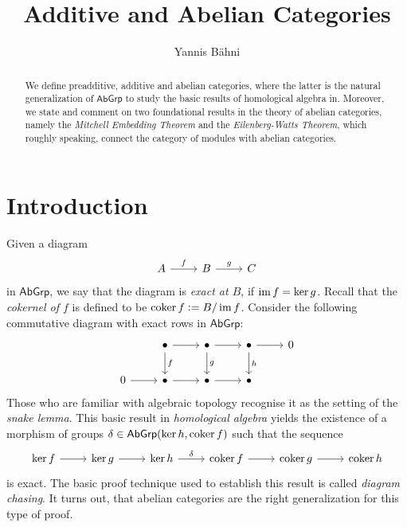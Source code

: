

\title{Additive and Abelian Categories}
\author{Yannis B\"{a}hni}
\address[Yannis B\"{a}hni]{University of Zurich, R\"{a}mistrasse 71, 8006 Zurich}



\begin{abstract}
	We define preadditive, additive and abelian categories, where the latter is the natural generalization of $\mathsf{AbGrp}$ to study the basic results of homological algebra in. Moreover, we state and comment on two foundational results in the theory of abelian categories, namely the \emph{Mitchell Embedding Theorem} and the \emph{Eilenberg-Watts Theorem}, which roughly speaking, connect the category of modules with abelian categories.
\end{abstract}

\maketitle

\tableofcontents

\section{Introduction}
Given a diagram
\begin{equation*}
	\begin{tikzcd}
		A \arrow[r,"f"] & B \arrow[r,"g"] & C
	\end{tikzcd}
\end{equation*}
\noindent in $\mathsf{AbGrp}$, we say that the diagram is \emph{exact at $B$}, if $\operatorname{im} f = \ker g$. Recall that the \emph{cokernel of $f$} is defined to be $\operatorname{coker} f := B/\operatorname{im} f$. Consider the following commutative diagram with exact rows in $\mathsf{AbGrp}$:
\begin{equation*}
	\begin{tikzcd}
		& \bullet \arrow[r]\arrow[d,"f"] & \bullet \arrow[r]\arrow[d,"g"] & \bullet \arrow[r]\arrow[d,"h"] & 0\\
		0 \arrow[r] & \bullet \arrow[r] & \bullet \arrow[r] & \bullet
	\end{tikzcd}
\end{equation*}
Those who are familiar with algebraic topology recognise it as the setting of the \emph{snake lemma}. This basic result in \emph{homological algebra} yields the existence of a morphism of groups $\delta \in \mathsf{AbGrp}(\ker h,\operatorname{coker} f)$ such that the sequence
\begin{equation*}
	\begin{tikzcd}
			\ker f \arrow[r] & \ker g \arrow[r] & \ker h \arrow[r,"\delta"] & \coker f \arrow[r] & \coker g \arrow[r] & \coker h
	 \end{tikzcd}
\end{equation*}
\noindent is exact. The basic proof technique used to establish this result is called \emph{diagram chasing}. It turns out, that abelian categories are the right generalization for this type of proof.

